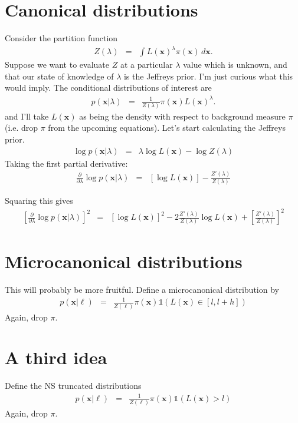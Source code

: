 \documentclass[a4paper, 11pt]{article}
\newcommand{\xx}{\boldsymbol{x}}	%
\begin{document}
\section{Canonical distributions}
Consider the partition function
\begin{eqnarray}
Z(\lambda) &=& \int L(\xx)^\lambda \pi(\xx) \, d\xx.
\end{eqnarray}
Suppose we want to evaluate $Z$ at a particular $\lambda$ value which is
unknown, and that our state of knowledge of $\lambda$ is the Jeffreys prior.
I'm just curious what this would imply. The conditional distributions of
interest are
\begin{eqnarray}
p(\xx | \lambda) &=& \frac{1}{Z(\lambda)}\pi(\xx)L(\xx)^\lambda.
\end{eqnarray}
and I'll take $L(\xx)$ as being the density with respect to background measure
$\pi$ (i.e. drop $\pi$ from the upcoming equations).
Let's start calculating the Jeffreys prior.
\begin{eqnarray}
\log p(\xx | \lambda) &=&  \lambda \log L(\xx) - \log Z(\lambda)
\end{eqnarray}
Taking the first partial derivative:
\begin{eqnarray}
\frac{\partial}{\partial \lambda}
\log p(\xx | \lambda) &=&
\left[\log L(\xx)\right] - \frac{Z'(\lambda)}{Z(\lambda)}
\end{eqnarray}

Squaring this gives
\begin{eqnarray}
\left[\frac{\partial}{\partial \lambda}
\log p(\xx | \lambda)\right]^2 &=&
\left[\log L(\xx)\right]^2 - 2\frac{Z'(\lambda)}{Z(\lambda)}\log L(\xx)
+ \left[\frac{Z'(\lambda)}{Z(\lambda)}\right]^2
\end{eqnarray}



\section{Microcanonical distributions}
This will probably be more fruitful. Define a microcanonical distribution by
\begin{eqnarray}
p(\xx | \ell) &=& \frac{1}{Z(\ell)}\pi(\xx)\mathds{1}
\left(L(\xx) \in [l, l + h]\right)
\end{eqnarray}
Again, drop $\pi$. 


\section{A third idea}
Define the NS truncated distributions
\begin{eqnarray}
p(\xx | \ell) &=& \frac{1}{Z(\ell)}\pi(\xx)\mathds{1}
\left(L(\xx) > l\right)
\end{eqnarray}
Again, drop $\pi$. 
\end{document}
